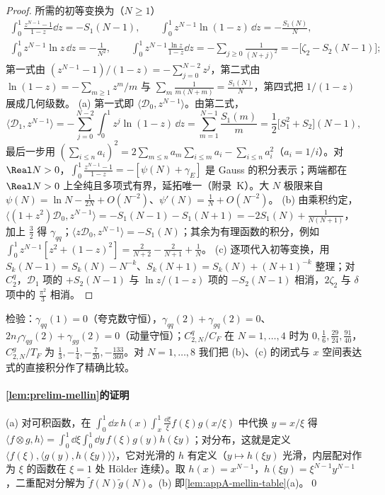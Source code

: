 \begin{proof}
所需的初等变换为（$N\ge1$）
\begin{gather*}
\int_0^1\frac{z^{N-1}-1}{1-z}\dd z=-S_1(N-1),\qquad \int_0^1z^{N-1}\ln(1-z)\,\dd z=-\frac{S_1(N)}N,\\
\int_0^1z^{N-1}\ln z\,\dd z=-\frac1{N^2},\qquad \int_0^1z^{N-1}\frac{\ln z}{1-z}\dd z=-\sum_{j\ge0}\frac1{(N+j)^2}=-\big[\zeta_2-S_2(N-1)\big];
\end{gather*}
第一式由 $(z^{N-1}-1)/(1-z)=-\sum_{j=0}^{N-2}z^j$，第二式由 $\ln(1-z)=-\sum_{m\ge1}z^m/m$ 与 $\sum_m\frac1{m(N+m)}=\frac{S_1(N)}N$，第四式把 $1/(1-z)$ 展成几何级数。
(a) 第一式即 $\langle\mathcal D_0,z^{N-1}\rangle$。由第二式，
\[
\langle\mathcal D_1,z^{N-1}\rangle=-\sum_{j=0}^{N-2}\int_0^1z^j\ln(1-z)\,\dd z=\sum_{m=1}^{N-1}\frac{S_1(m)}m=\frac12\big[S_1^2+S_2\big](N-1),
\]
最后一步用 $(\sum_{i\le n}a_i)^2=2\sum_{m\le n}a_m\sum_{i\le m}a_i-\sum_{i\le n}a_i^2$（$a_i=1/i$）。对 $\Real N>0$，$\int_0^1\frac{z^{N-1}-1}{1-z}=-[\psi(N)+\gamma_E]$ 是 Gauss 的积分表示；两端都在 $\Real N>0$ 上全纯且多项式有界，延拓唯一（附录~K）。大 $N$ 极限来自 $\psi(N)=\ln N-\frac1{2N}+O(N^{-2})$、$\psi'(N)=\frac1N+O(N^{-2})$。
(b) 由乘积约定，$\langle(1+z^2)\mathcal D_0,z^{N-1}\rangle=-S_1(N-1)-S_1(N+1)=-2S_1(N)+\frac1{N(N+1)}$，加上 $\frac32$ 得 $\gamma_{qq}$；$\langle z\mathcal D_0,z^{N-1}\rangle=-S_1(N)$；其余为有理函数的积分，例如 $\int_0^1z^{N-1}[z^2+(1-z)^2]=\frac2{N+2}-\frac2{N+1}+\frac1N$。
(c) 逐项代入初等变换，用 $S_k(N-1)=S_k(N)-N^{-k}$、$S_k(N+1)=S_k(N)+(N+1)^{-k}$ 整理；对 $C_2^q$，$\mathcal D_1$ 项的 $+S_2(N-1)$ 与 $\ln z/(1-z)$ 项的 $-S_2(N-1)$ 相消，$2\zeta_2$ 与 $\delta$ 项中的 $\frac{\pi^2}3$ 相消。
\end{proof}

检验：$\gamma_{qq}(1)=0$（夸克数守恒），$\gamma_{qq}(2)+\gamma_{gq}(2)=0$、$2n_f\gamma_{qg}(2)+\gamma_{gg}(2)=0$（动量守恒）；$C^q_{2,N}/C_F$ 在 $N=1,\dots,4$ 时为 $0,\frac16,\frac{29}{24},\frac{91}{40}$，$C^g_{2,N}/T_F$ 为 $\frac13,-\frac14,-\frac7{20},-\frac{133}{360}$。对 $N=1,\dots,8$ 我们把 (b)、(c) 的闭式与 $x$ 空间表达式的直接积分作了精确比较。

\paragraph{\cref{lem:prelim-mellin}的证明}
(a) 对可积函数，在 $\int_0^1\dd x\,h(x)\int_x^1\frac{\dd\xi}\xi f(\xi)g(x/\xi)$ 中代换 $y=x/\xi$ 得 $\langle f\otimes g,h\rangle=\int_0^1\!\dd\xi\int_0^1\!\dd y\,f(\xi)g(y)h(\xi y)$；对分布，这就是定义 $\langle f(\xi),\langle g(y),h(\xi y)\rangle\rangle$，它对光滑的 $h$ 有定义（$y\mapsto h(\xi y)$ 光滑，内层配对作为 $\xi$ 的函数在 $\xi=1$ 处 Hölder 连续）。取 $h(x)=x^{N-1}$，$h(\xi y)=\xi^{N-1}y^{N-1}$，二重配对分解为 $\tilde f(N)\tilde g(N)$。(b) 即\cref{lem:appA-mellin-table}(a)。\qed
